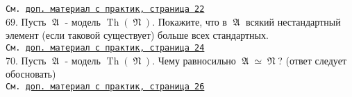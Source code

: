 \documentclass[a4paper,100pt]{article}
\theoremstyle{indented}
\theoremstyle{definition}
\theoremstyle{remark}
\DeclareMathOperator{\Th}{Th}
\DeclareMathOperator{\GA}{\mathfrak{A}}
\DeclareMathOperator{\GN}{\mathfrak{N}}
\begin{document}
\texttt{См. \href{http://www.mi-ras.ru/~speranski/courses/logic-1-2021-spring/slides-axiomatisability.pdf}{доп. материал с практик, страница 22}} \\

69. Пусть $\GA$ - модель $\Th(\GN)$. Покажите, что в $\GA$ всякий нестандартный элемент (если таковой существует) больше всех стандартных. \\ 

\texttt{См. \href{http://www.mi-ras.ru/~speranski/courses/logic-1-2021-spring/slides-axiomatisability.pdf}{доп. материал с практик, страница 24}} \\

70. Пусть $\GA$ - модель $\Th(\GN)$. Чему равносильно $\GA \simeq \GN$? (ответ следует обосновать) \\

\texttt{См. \href{http://www.mi-ras.ru/~speranski/courses/logic-1-2021-spring/slides-axiomatisability.pdf}{доп. материал с практик, страница 26}} \\
\end{document}
